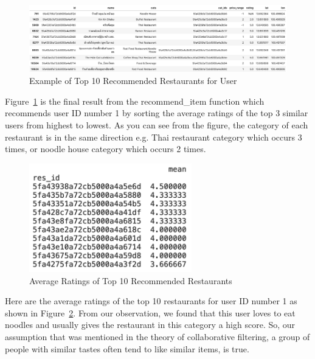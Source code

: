 \documentclass[12pt,oneside,openright,a4paper]{cpe-english-project}
\begin{document}
\begin{figure}[H]\centering
\includegraphics[width=350pt]{./images/4ExampleofTop10RecommendedRestaurantsforUser.png}
\caption{Example of Top 10 Recommended Restaurants for User}\label{fig:4ExampleofTop10RecommendedRestaurantsforUser}
\end{figure}\vspace{-24pt}

Figure~\ref{fig:4ExampleofTop10RecommendedRestaurantsforUser} is the final result from the recommend\_item function which recommends user ID number 1 by sorting the average ratings of the top 3 similar users from highest to lowest. As you can see from the figure, the category of each restaurant is in the same direction e.g. Thai restaurant category which occurs 3 times, or noodle house category which occurs 2 times.

\begin{figure}[H]\centering
\includegraphics[width=200pt]{./images/4AverageRatingsofTop10RecommendedRestaurants.png}
\caption{Average Ratings of Top 10 Recommended Restaurants}\label{fig:4AverageRatingsofTop10RecommendedRestaurants}
\end{figure}\vspace{-24pt}

Here are the average ratings of the top 10 restaurants for user ID number 1 as shown in Figure~\ref{fig:4AverageRatingsofTop10RecommendedRestaurants}. From our observation, we found that this user loves to eat noodles and usually gives the restaurant in this category a high score. So, our assumption that was mentioned in the theory of collaborative filtering, a group of people with similar tastes often tend to like similar items, is true.
\end{document}
